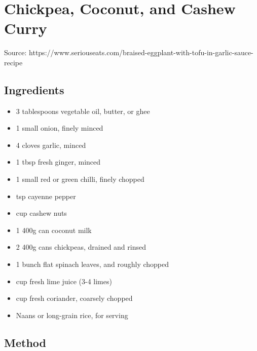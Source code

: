 \clearpage
\section{Chickpea, Coconut, and Cashew Curry}


Source: https://www.seriouseats.com/braised-eggplant-with-tofu-in-garlic-sauce-recipe

\subsection{Ingredients}

\begin{itemize}
    \item 3 tablespoons vegetable oil, butter, or ghee
    \item 1 small onion, finely minced
    \item 4 cloves garlic, minced
    \item 1 tbsp fresh ginger, minced
    \item 1 small red or green chilli, finely chopped
    \item {} tsp cayenne pepper
    \item {} cup cashew nuts
    \item 1 400g can coconut milk
    \item 2 400g cans chickpeas, drained and rinsed
    \item 1 bunch flat spinach leaves, and roughly chopped
    \item {} cup fresh lime juice (3-4 limes)
    \item {} cup fresh coriander, coarsely chopped
    \item Naans or long-grain rice, for serving
\end{itemize}

\subsection{Method}

